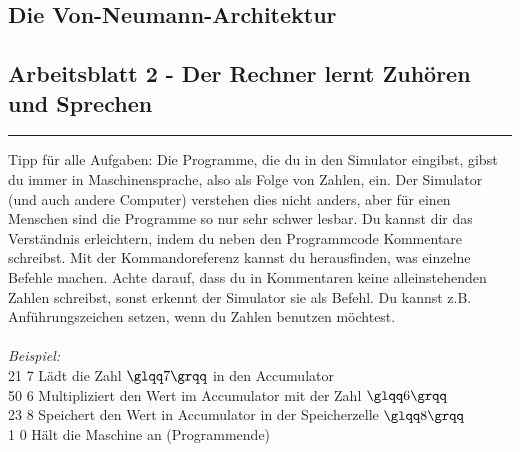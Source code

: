 \documentclass[a4paper,12pt]{article}
\newcounter{aufgnr}
\begin{document}
\begin{center}
\section*{Die Von-Neumann-Architektur}
\subsection*{Arbeitsblatt 2 - Der Rechner lernt Zuhören und Sprechen}
\end{center}

\hrule
\vspace{.5cm}

Tipp für alle Aufgaben: Die Programme, die du in den Simulator eingibst, gibst du immer in Maschinensprache, also als Folge von Zahlen, ein. Der Simulator (und auch andere Computer) verstehen dies nicht anders, aber für einen Menschen sind die Programme so nur sehr schwer lesbar. Du kannst dir das Verständnis erleichtern, indem du neben den Programmcode Kommentare schreibst. Mit der Kommandoreferenz kannst du herausfinden, was einzelne Befehle machen. Achte darauf, dass du in Kommentaren keine alleinstehenden Zahlen schreibst, sonst erkennt der Simulator sie als Befehl. Du kannst z.B. Anführungszeichen setzen, wenn du Zahlen benutzen möchtest.\\
\\
\textit{Beispiel:}\\
21 7 Lädt die Zahl $\glqq 7\grqq$ in den Accumulator\\
50 6 Multipliziert den Wert im Accumulator mit der Zahl $\glqq 6\grqq$\\
23 8 Speichert den Wert in Accumulator in der Speicherzelle $\glqq 8\grqq$\\
1 0 Hält die Maschine an (Programmende)\\
\\
\end{document}
